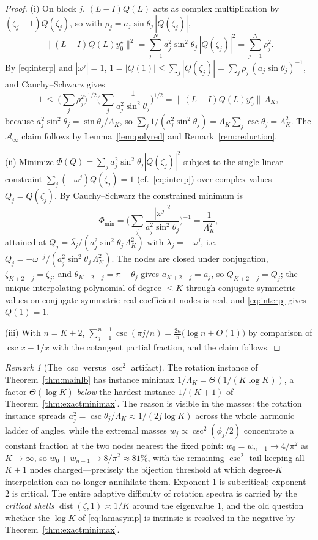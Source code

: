 \documentclass[11pt]{article}
\theoremstyle{definition}
\theoremstyle{remark}
\newtheorem{remark}[theorem]{Remark}
\DeclareMathOperator{\dist}{dist}
\newcommand{\Aa}{\mathcal{A}}
\newcommand{\norm}[1]{\| #1 \|}
\newcommand{\abs}[1]{| #1 |}
\begin{document}
\begin{proof}
(i) On block $j$, $(L-I)Q(L)$ acts as complex multiplication by
$(\zeta_j-1)Q(\zeta_j)$, so with $\rho_j=a_j\sin\theta_j\,\abs{Q(\zeta_j)}$,
\[
\norm{(L-I)Q(L)y_0^\star}^2=\sum_{j=1}^N a_j^2\sin^2\theta_j\,
\abs{Q(\zeta_j)}^2=\sum_{j=1}^N\rho_j^2 .
\]
By \eqref{eq:interp} and $\abs{\omega^j}=1$,
$1=\abs{Q(1)}\le\sum_j\abs{Q(\zeta_j)}
=\sum_j \rho_j\,(a_j\sin\theta_j)^{-1}$, and Cauchy--Schwarz gives
\[
1\ \le\ \Big(\sum_j\rho_j^2\Big)^{1/2}
\Big(\sum_j\frac1{a_j^2\sin^2\theta_j}\Big)^{1/2}
=\norm{(L-I)Q(L)y_0^\star}\,\Lambda_K,
\]
because $a_j^2\sin^2\theta_j=\sin\theta_j/\Lambda_K$, so
$\sum_j 1/(a_j^2\sin^2\theta_j)=\Lambda_K\sum_j\csc\theta_j=\Lambda_K^2$.
The $\Aa_\infty$ claim follows by Lemma~\ref{lem:polyred} and
Remark~\ref{rem:reduction}.

(ii) Minimize $\Phi(Q)=\sum_j a_j^2\sin^2\theta_j\abs{Q(\zeta_j)}^2$ subject
to the single linear constraint $\sum_j(-\omega^j)Q(\zeta_j)=1$
(cf.~\eqref{eq:interp}) over complex values $Q_j=Q(\zeta_j)$. By
Cauchy--Schwarz the constrained minimum is
\[
\Phi_{\min}=\Big(\sum_j\frac{\abs{\omega^j}^2}{a_j^2\sin^2\theta_j}
\Big)^{-1}=\frac1{\Lambda_K^2},
\]
attained at $Q_j=\overline{\lambda_j}/(a_j^2\sin^2\theta_j\,\Lambda_K^2)$
with $\lambda_j=-\omega^j$, i.e.\
$Q_j=-\omega^{-j}/(a_j^2\sin^2\theta_j\,\Lambda_K^2)$. The nodes are closed
under conjugation, $\zeta_{K+2-j}=\overline{\zeta_j}$, and
$\theta_{K+2-j}=\pi-\theta_j$ gives $a_{K+2-j}=a_j$, so
$Q_{K+2-j}=\overline{Q_j}$; the unique interpolating polynomial of degree
$\le K$ through conjugate-symmetric values on conjugate-symmetric real-coefficient
nodes is real, and \eqref{eq:interp} gives $\bar Q(1)=1$.

(iii) With $n=K+2$,
$\sum_{j=1}^{n-1}\csc(\pi j/n)=\frac{2n}{\pi}\big(\log n+O(1)\big)$
by comparison of $\csc x-1/x$ with the cotangent partial fraction, and the
claim follows.
\end{proof}

\begin{remark}[The $\csc$ versus $\csc^2$ artifact]\label{rem:artifact}
The rotation instance of Theorem~\ref{thm:mainlb} has instance minimax
$1/\Lambda_K=\Theta(1/(K\log K))$, a factor $\Theta(\log K)$ \emph{below}
the hardest instance $1/(K+1)$ of Theorem~\ref{thm:exactminimax}. The
reason is visible in the masses: the rotation instance spreads
$a_j^2=\csc\theta_j/\Lambda_K\approx1/(2j\log K)$ across the whole harmonic
ladder of angles, while the extremal masses $w_j\propto\csc^2(\phi_j/2)$
concentrate a constant fraction at the two nodes nearest the fixed point:
$w_0=w_{n-1}\to4/\pi^2$ as $K\to\infty$, so
$w_0+w_{n-1}\to8/\pi^2\approx81\%$, with the remaining $\csc^2$ tail
keeping all $K+1$ nodes charged---precisely the bijection threshold at
which degree-$K$ interpolation can no longer annihilate them. Exponent $1$
is subcritical; exponent $2$ is critical. The entire adaptive difficulty
of rotation spectra is carried by the \emph{critical shells}
$\dist(\zeta,1)\asymp1/K$ around the eigenvalue $1$, and the old question
whether the $\log K$ of \eqref{eq:lamasymp} is intrinsic is resolved in
the negative by Theorem~\ref{thm:exactminimax}.
\end{remark}
\end{document}
